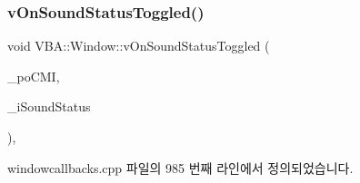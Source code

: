 \subsubsection{\texorpdfstring{v\+On\+Sound\+Status\+Toggled()}{vOnSoundStatusToggled()}}
{\footnotesize\ttfamily void V\+B\+A\+::\+Window\+::v\+On\+Sound\+Status\+Toggled (\begin{DoxyParamCaption}\item[{Gtk\+::\+Check\+Menu\+Item $\ast$}]{\+\_\+po\+C\+MI,  }\item[{\mbox{\hyperlink{_util_8cpp_a0ef32aa8672df19503a49fab2d0c8071}{int}}}]{\+\_\+i\+Sound\+Status }\end{DoxyParamCaption})\hspace{0.3cm}{\ttfamily [protected]}, {\ttfamily [virtual]}}



windowcallbacks.\+cpp 파일의 985 번째 라인에서 정의되었습니다.


